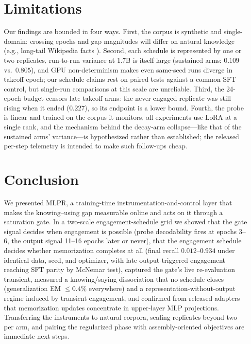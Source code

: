 \section{Limitations}
\label{sec:limitations}

Our findings are bounded in four ways. First, the corpus is synthetic
and single-domain: crossing epochs and gap magnitudes will differ on
natural knowledge (e.g., long-tail Wikipedia facts
\citep{kandpal2023large}). Second, each schedule is represented by one
or two replicates, run-to-run variance at 1.7B is itself large
(sustained arms: $0.109$ vs.\ $0.805$), and GPU non-determinism makes
even same-seed runs diverge in takeoff epoch; our schedule claims rest
on paired tests against a common SFT control, but single-run
comparisons at this scale are unreliable. Third, the 24-epoch budget
censors late-takeoff arms: the never-engaged replicate was still
rising when it ended ($0.227$), so its endpoint is a lower bound.
Fourth, the probe is linear and trained on the corpus it monitors,
all experiments use LoRA at a single rank, and the mechanism behind
the decay-arm collapse---like that of the sustained arms'
variance---is hypothesized rather than established; the released
per-step telemetry is intended to make such follow-ups cheap.

\section{Conclusion}
\label{sec:conclusion}

We presented MLPR, a training-time instrumentation-and-control layer
that makes the knowing--using gap measurable online and acts on it
through a saturation gate. In a two-scale engagement-schedule grid we
showed that the gate signal decides when engagement is possible
(probe decodability fires at epochs 3--6, the output signal 11--16
epochs later or never), that the engagement schedule decides whether
memorization completes at all (final recall $0.012$--$0.934$ under
identical data, seed, and optimizer, with late output-triggered
engagement reaching SFT parity by McNemar test), captured the gate's
live re-evaluation transient, measured a knowing/saying dissociation
that no schedule closes (generalization EM $\le 0.4\%$ everywhere)
and a representation-without-output regime induced by transient
engagement, and confirmed from released adapters that memorization
updates concentrate in upper-layer MLP projections. Transferring the
instruments to natural corpora, scaling replicates beyond two per
arm, and pairing the regularized phase with assembly-oriented
objectives are immediate next steps.

